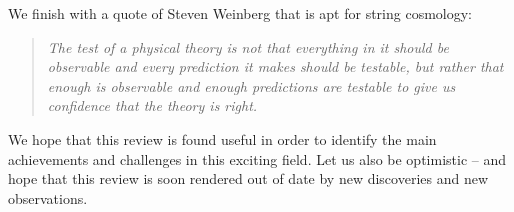  We finish with a quote of Steven Weinberg that is apt for string cosmology: 
 
 \begin{quote}{\it The test of a physical theory is not that everything in it should be observable and every prediction it makes should be testable, but rather that enough is observable and enough predictions are testable to give us confidence that the theory is right.}
 \end{quote} %
   
We hope that this review is found useful in order to identify the main achievements and challenges in this exciting field. Let us also be optimistic
-- and hope that this review is soon rendered out of date by new discoveries and new observations. 
 
